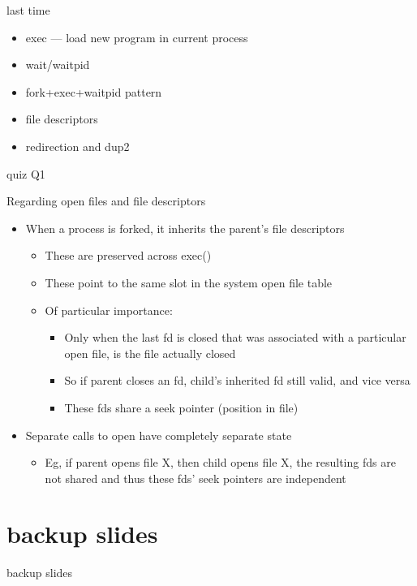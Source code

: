 \date{}
\title{}
\date{}

\begin{frame}
    \titlepage
\end{frame}



\begin{frame}{last time}
    \begin{itemize}
    \item exec --- load new program in current process
    \item wait/waitpid
    \item fork+exec+waitpid pattern
    \item file descriptors
    \item redirection and dup2
    \end{itemize}
\end{frame}

\begin{frame}{quiz Q1}
\end{frame}

\begin{frame}{Regarding open files and file descriptors}
\begin{itemize}
  \item	When a process is forked, it inherits the parent’s file descriptors
  \begin{itemize} 
    \item These are preserved across exec()
    \item These point to the same slot in the system open file table
    \item Of particular importance:
    \begin{itemize}
      \item Only when the last fd is closed that was associated with a particular open file, is the file actually closed
      \item So if parent closes an fd, child’s inherited fd still valid, and vice versa
      \item These fds share a seek pointer (position in file)
    \end{itemize}
  \end{itemize}
  \item Separate calls to open have completely separate state
  \begin{itemize}
    \item Eg, if parent opens file X, then child opens file X, the resulting fds are not shared and thus these fds’ seek pointers are independent 
  \end{itemize}
\end{itemize}
\end{frame}




\section{backup slides}
\begin{frame}{backup slides}
\end{frame}




